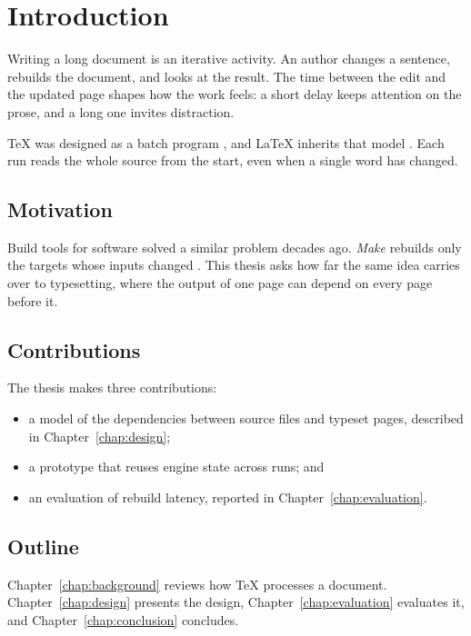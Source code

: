 \chapter{Introduction}
\label{chap:introduction}

Writing a long document is an iterative activity. An author changes a
sentence, rebuilds the document, and looks at the result. The time between
the edit and the updated page shapes how the work feels: a short delay keeps
attention on the prose, and a long one invites distraction.

\TeX{} was designed as a batch program \citep{knuth1984texbook}, and
\LaTeX{} inherits that model \citep{lamport1994latex}. Each run reads the
whole source from the start, even when a single word has changed.

\section{Motivation}
\label{sec:motivation}

Build tools for software solved a similar problem decades ago. \emph{Make}
rebuilds only the targets whose inputs changed \citep{feldman1979make}. This
thesis asks how far the same idea carries over to typesetting, where the
output of one page can depend on every page before it.

\section{Contributions}
\label{sec:contributions}

The thesis makes three contributions:
\begin{itemize}
  \item a model of the dependencies between source files and typeset pages,
        described in Chapter~\ref{chap:design};
  \item a prototype that reuses engine state across runs; and
  \item an evaluation of rebuild latency, reported in
        Chapter~\ref{chap:evaluation}.
\end{itemize}

\section{Outline}
\label{sec:outline}

Chapter~\ref{chap:background} reviews how \TeX{} processes a document.
Chapter~\ref{chap:design} presents the design, Chapter~\ref{chap:evaluation}
evaluates it, and Chapter~\ref{chap:conclusion} concludes.
